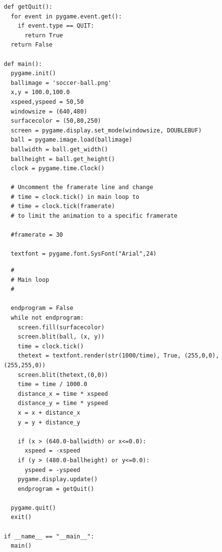 \begin{verbatim}
def getQuit():
  for event in pygame.event.get():
    if event.type == QUIT:
      return True
  return False

def main():
  pygame.init()
  ballimage = 'soccer-ball.png'
  x,y = 100.0,100.0
  xspeed,yspeed = 50,50
  windowsize = (640,480)
  surfacecolor = (50,80,250)
  screen = pygame.display.set_mode(windowsize, DOUBLEBUF)
  ball = pygame.image.load(ballimage)
  ballwidth = ball.get_width()
  ballheight = ball.get_height()
  clock = pygame.time.Clock()

  # Uncomment the framerate line and change
  # time = clock.tick() in main loop to
  # time = clock.tick(framerate)
  # to limit the animation to a specific framerate

  #framerate = 30

  textfont = pygame.font.SysFont("Arial",24)
\end{verbatim}

\begin{verbatim}
  #
  # Main loop
  #

  endprogram = False
  while not endprogram:
    screen.fill(surfacecolor)
    screen.blit(ball, (x, y))
    time = clock.tick()
    thetext = textfont.render(str(1000/time), True, (255,0,0),(255,255,0))
    screen.blit(thetext,(0,0))
    time = time / 1000.0
    distance_x = time * xspeed
    distance_y = time * yspeed
    x = x + distance_x
    y = y + distance_y

    if (x > (640.0-ballwidth) or x<=0.0):
      xspeed = -xspeed
    if (y > (480.0-ballheight) or y<=0.0):
      yspeed = -yspeed
    pygame.display.update()
    endprogram = getQuit()

  pygame.quit()
  exit()

if __name__ == "__main__":
  main()
\end{verbatim}

